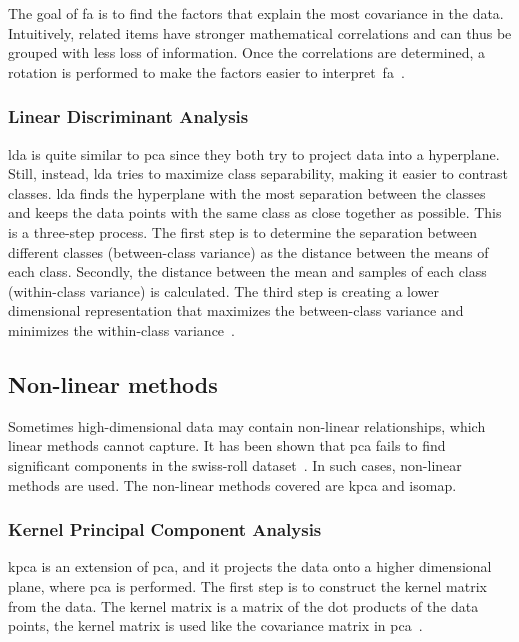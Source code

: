 The goal of \gls{fa} is to find the factors that explain the most covariance in the data. Intuitively, related items have stronger mathematical correlations and can thus be grouped with less loss of information. Once the correlations are determined, a rotation is performed to make the factors easier to interpret~\gls{fa}~\cite{decoster-1998-factor-analysis-overview}.


\subsubsection{Linear Discriminant Analysis}\label{subsubsec:linear-discriminant-analysis}

\gls{lda} is quite similar to \gls{pca} since they both try to project data into a hyperplane. Still, instead, \gls{lda} tries to maximize class separability, making it easier to contrast classes. \gls{lda} finds the hyperplane with the most separation between the classes and keeps the data points with the same class as close together as possible. This is a three-step process. The first step is to determine the separation between different classes (between-class variance) as the distance between the means of each class. Secondly, the distance between the mean and samples of each class (within-class variance) is calculated. The third step is creating a lower dimensional representation that maximizes the between-class variance and minimizes the within-class variance~\cite{linear-discriminant-analysis-tutorial}.


\subsection{Non-linear methods}\label{subsec:non-linear-methods}
Sometimes high-dimensional data may contain non-linear relationships, which linear methods cannot capture. It has been shown that \gls{pca} fails to find significant components in the swiss-roll dataset~\cite{tennenbaum}. In such cases, non-linear methods are used. The non-linear methods covered are \gls{kpca} and \gls{isomap}.


\subsubsection{Kernel Principal Component Analysis}\label{subsubsec:kernel-principal-component-analysis}
\gls{kpca} is an extension of \gls{pca}, and it projects the data onto a higher dimensional plane, where \gls{pca} is performed.
The first step is to construct the kernel matrix from the data. The kernel matrix is a matrix of the dot products of the data points, the kernel matrix is used like the covariance matrix in \gls{pca}~\cite{kernel-pca}.

